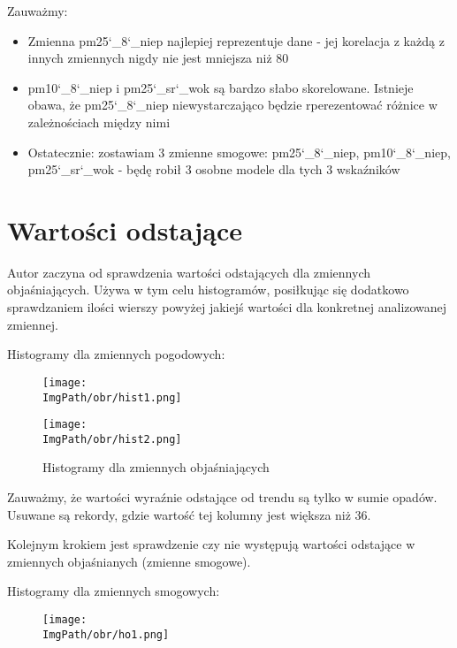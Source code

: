 \documentclass[a4paper,12pt,twoside,openany]{report}
\newcommand{\ImgPath}{.}
\begin{document}
Zauważmy:

\begin{itemize}
	\item Zmienna pm25\char`_8\char`_niep najlepiej reprezentuje dane - jej korelacja z każdą z innych zmiennych nigdy nie jest mniejsza niż 80%
	\item pm10\char`_8\char`_niep i pm25\char`_sr\char`_wok są bardzo słabo skorelowane. Istnieje obawa, że pm25\char`_8\char`_niep niewystarczająco będzie rperezentować różnice w zależnościach między nimi
	\item Ostatecznie: zostawiam 3 zmienne smogowe: pm25\char`_8\char`_niep, pm10\char`_8\char`_niep, pm25\char`_sr\char`_wok - będę robił 3 osobne modele dla tych 3 wskaźników
\end{itemize}

\section{Wartości odstające}

Autor zaczyna od sprawdzenia wartości odstających dla zmiennych objaśniających. Używa w tym celu histogramów, posiłkując się dodatkowo sprawdzaniem ilości wierszy powyżej jakiejś wartości dla konkretnej analizowanej zmiennej.

Histogramy dla zmiennych pogodowych:

\begin{figure}[H]
	\begin{center}
		\centering
		\texttt{[image: \\ImgPath/obr/hist1.png]}
	\end{center}
	\label{hist1}
\end{figure}

\begin{figure}[H]
	\begin{center}
		\centering
		\texttt{[image: \\ImgPath/obr/hist2.png]}
	\end{center}
	\caption{Histogramy dla zmiennych objaśniających}
	\label{hist2}
\end{figure}

Zauważmy, że wartości wyraźnie odstające od trendu są tylko w sumie opadów. Usuwane są rekordy, gdzie wartość tej kolumny jest większa niż 36.

Kolejnym krokiem jest sprawdzenie czy nie występują wartości odstające w zmiennych objaśnianych (zmienne smogowe).

Histogramy dla zmiennych smogowych:

\begin{figure}[H]
	\begin{center}
		\centering
		\texttt{[image: \\ImgPath/obr/ho1.png]}
	\end{center}
	\label{ho1}
\end{figure}
\end{document}
